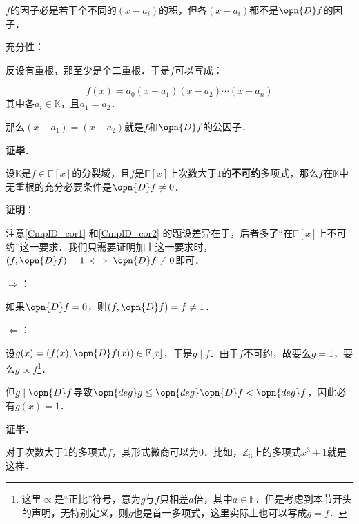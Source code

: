 $f$的因子必是若干个不同的$(x-a_i)$的积，但各$(x-a_i)$都不是$\opn{D}f$的因子．

充分性：

反设有重根，那至少是个二重根．于是$f$可以写成：

\begin{equation}
f(x) = a_0(x-a_1)(x-a_2)\cdots(x-a_n)
\end{equation}
其中各$a_i\in\mathbb{K}$，且$a_1=a_2$．

那么$(x-a_1)=(x-a_2)$就是$f$和$\opn{D}f$的公因子．

\textbf{证毕}．



\begin{corollary}{}\label{CmplD_cor2}
设$\mathbb{K}$是$f\in\mathbb{F}[x]$的分裂域，且$f$是$\mathbb{F}[x]$上次数大于$1$的\textbf{不可约}多项式，那么$f$在$\mathbb{K}$中无重根的充分必要条件是$\opn{D}f \neq 0$．
\end{corollary}

\textbf{证明}：

注意\autoref{CmplD_cor1} 和\autoref{CmplD_cor2} 的题设差异在于，后者多了“在$\mathbb{F}[x]$上不可约”这一要求．我们只需要证明加上这一要求时，$(f, \opn{D}f)=1 \iff \opn{D}f\neq 0$即可．

$\Rightarrow$：

如果$\opn{D}f=0$，则$(f, \opn{D}f)=f\neq 1$．

$\Leftarrow$：

设$g(x)=(f(x), \opn{D}f(x))\in\mathbb{F}[x]$，于是$g\mid f$．由于$f$不可约，故要么$g=1$，要么$g\propto f$\footnote{这里$\propto$是“正比”符号，意为$g$与$f$只相差$a$倍，其中$a\in\mathbb{F}$．但是考虑到本节开头的声明，无特别定义，则$g$也是首一多项式，这里实际上也可以写成$g=f$．}．

但$g\mid \opn{D}f$导致$\opn{deg}g\leq\opn{deg}\opn{D}f<\opn{deg}f$，因此必有$g(x)=1$．



\textbf{证毕}．

对于次数大于$1$的多项式$f$，其形式微商可以为$0$．比如，$\mathbb{Z}_3$上的多项式$x^3+1$就是这样．





\begin{example}{}



\end{example}





















